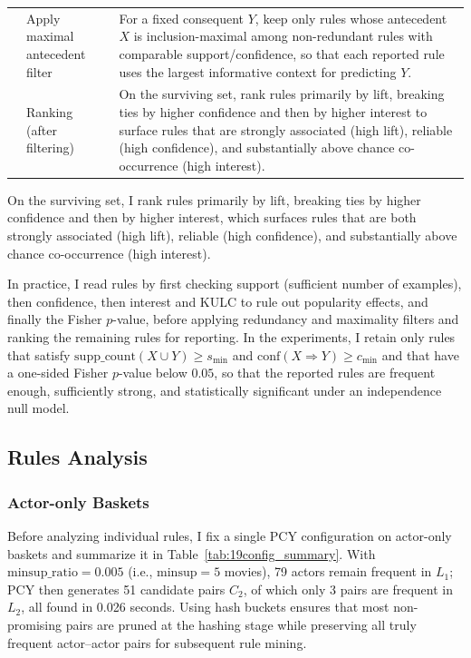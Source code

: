 \documentclass{article}  %
\begin{document}
\begin{table}[!htbp]
\begin{tabularx}{\textwidth}{
        >{\centering\arraybackslash}p{}
        >{\raggedright\arraybackslash}p{}
        >{\raggedright\arraybackslash}X
    }
        6 & Apply maximal antecedent filter &
        For a fixed consequent \(Y\), keep only rules whose antecedent \(X\) is
        inclusion-maximal among non-redundant rules with comparable
        support/confidence, so that each reported rule uses the largest
        informative context for predicting \(Y\). \\

        7 & Ranking (after filtering) &
        On the surviving set, rank rules primarily by lift, breaking ties by
        higher confidence and then by higher interest to surface rules that are
        strongly associated (high lift), reliable (high confidence), and
        substantially above chance co-occurrence (high interest). \\
        \bottomrule
    \end{tabularx}
    \label{tab:18filter_rank_policy}
\end{table}



\FloatBarrier
On the surviving set, I rank rules primarily by lift, breaking ties by higher
confidence and then by higher interest, which surfaces rules that are both
strongly associated (high lift), reliable (high confidence), and substantially
above chance co-occurrence (high interest). 

In practice, I read rules by first checking support (sufficient number of examples), then confidence, then interest and KULC to rule out popularity effects, and finally the Fisher \(p\)-value, before applying redundancy and maximality filters and ranking the remaining rules for reporting.  In the experiments, I retain only rules that satisfy \(\mathrm{supp\_count}(X \cup Y) \ge s_{\min}\) and
\(\mathrm{conf}(X \Rightarrow Y) \ge c_{\min}\) and that have a one-sided Fisher \(p\)-value below \(0.05\), so that the reported rules are frequent enough, sufficiently strong, and statistically
significant under an independence null model.

\subsection{Rules Analysis}

\subsubsection{Actor-only Baskets}

Before analyzing individual rules, I fix a single PCY configuration on actor-only baskets and summarize it in Table~\ref{tab:19config_summary}. With \(\text{minsup\_ratio} = 0.005\) (i.e., \(\text{minsup} = 5\) movies), 79 actors remain frequent in \(L_1\); PCY then generates 51 candidate pairs \(C_2\), of which only 3 pairs are frequent in \(L_2\), all found in 0.026 seconds. Using hash buckets ensures that most non-promising pairs are pruned at the hashing stage while preserving all truly frequent actor--actor pairs for subsequent rule mining.
\end{document}
